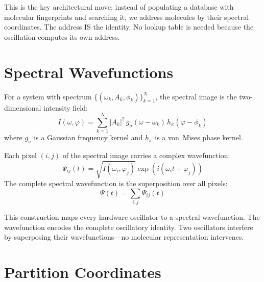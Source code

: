 \begin{remark}
This is the key architectural move: instead of populating a database with molecular fingerprints and searching it, we address molecules by their spectral coordinates. The address IS the identity. No lookup table is needed because the oscillation computes its own address.
\end{remark}

\section{Spectral Wavefunctions}
\label{sec:wavefunctions}

\begin{definition}
\label{def:spectral_image}
For a system with spectrum $\{(\omega_k, A_k, \phi_k)\}_{k=1}^{N}$, the spectral image is the two-dimensional intensity field:
\begin{equation}
    I(\omega, \varphi) = \sum_{k=1}^{N} |A_k|^2\, g_\sigma(\omega - \omega_k)\, h_\kappa(\varphi - \phi_k)
\end{equation}
where $g_\sigma$ is a Gaussian frequency kernel and $h_\kappa$ is a von~Mises phase kernel.
\end{definition}

\begin{definition}
\label{def:wavefunction}
Each pixel $(i,j)$ of the spectral image carries a complex wavefunction:
\begin{equation}
    \Psi_{ij}(t) = \sqrt{I(\omega_i, \varphi_j)} \exp\!\left(i(\omega_i t + \varphi_j)\right)
\end{equation}
The complete spectral wavefunction is the superposition over all pixels:
\begin{equation}
    \Psi(t) = \sum_{i,j} \Psi_{ij}(t)
\end{equation}
\end{definition}

This construction maps every hardware oscillator to a spectral wavefunction. The wavefunction encodes the complete oscillatory identity. Two oscillators interfere by superposing their wavefunctions---no molecular representation intervenes.

\section{Partition Coordinates}
\label{sec:partition_coords}

